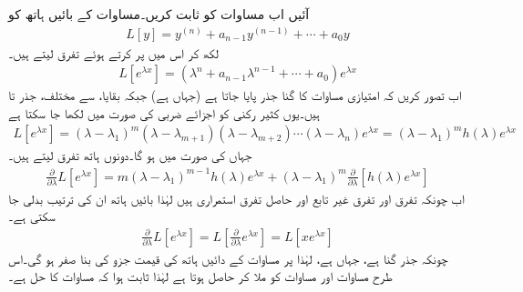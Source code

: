 آئیں اب مساوات  کو ثابت کریں۔مساوات  کے بائیں ہاتھ کو
\begin{align*}
L[y]=y^{(n)}+a_{n-1}y^{(n-1)}+\cdots+a_0y
\end{align*}
لکھ کر اس میں  پر کرتے ہوئے تفرق لیتے ہیں۔
\begin{align*}
L[e^{\lambda x}]=(\lambda^n+a_{n-1}\lambda^{n-1}+\cdots+a_0)e^{\lambda x}
\end{align*}
اب تصور کریں کہ امتیازی مساوات کا  گنا جذر  پایا جاتا ہے (جہاں  ہے) جبکہ بقایا،  سے مختلف، جذر  تا  ہیں۔یوں کثیر رکنی کو اجزائے ضربی کی صورت میں لکھا جا سکتا ہے
\begin{align}\label{مساوات_سادہ_بلند_متعدد_گنا_جذر_ب}
L[e^{\lambda x}]=(\lambda-\lambda_1)^m(\lambda-\lambda_{m+1})(\lambda-\lambda_{m+2}) \cdots (\lambda-\lambda_n)e^{\lambda x}=(\lambda-\lambda_1)^m h(\lambda)e^{\lambda x}
\end{align}
جہاں  کی صورت  میں  ہو گا۔دونوں ہاتھ  تفرق لیتے ہیں۔
\begin{align}\label{مساوات_سادہ_بلند_متعدد_گنا_جذر_پ}
\frac{\partial }{\partial \lambda} L[e^{\lambda x}]=m(\lambda-\lambda_1)^{m-1}h(\lambda)e^{\lambda x}+(\lambda-\lambda_1)^m \frac{\partial}{\partial \lambda}[h(\lambda)e^{\lambda x}]
\end{align}
اب چونکہ  تفرق اور  تفرق غیر تابع  اور حاصل تفرق استمراری ہیں لہٰذا بائیں ہاتھ ان کی ترتیب بدلی جا سکتی ہے۔
\begin{align}\label{مساوات_سادہ_بلند_متعدد_گنا_جذر_ت}
\frac{\partial}{\partial \lambda} L[{e^{\lambda x}}]=L\left[\frac{\partial}{\partial \lambda} e^{\lambda x}\right]=L[xe^{\lambda x}]
\end{align}
چونکہ  جذر  گنا ہے، جہاں  ہے، لہٰذا   پر مساوات  کے دائیں ہاتھ  کی قیمت جزو  کی بنا صفر ہو گی۔اس طرح  مساوات  اور مساوات  کو ملا کر  حاصل ہوتا ہے لہٰذا ثابت ہوا کہ  مساوات  کا حل ہے۔

